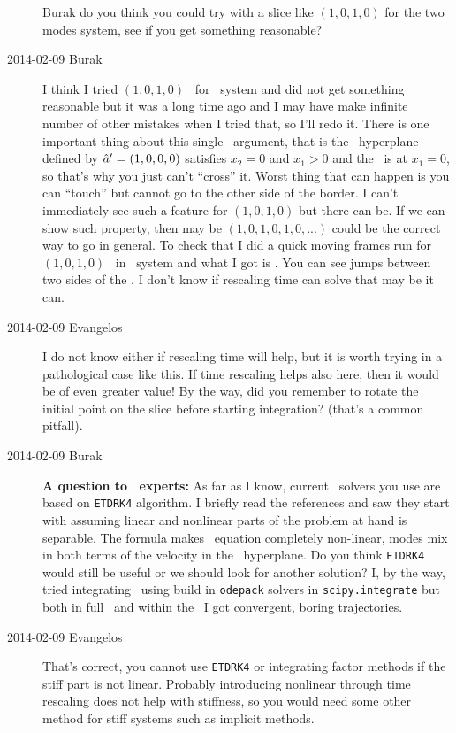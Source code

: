 \begin{description}
Burak do you think you could try  with a slice like
$(1,0,1,0)$ for the two modes system, see if you get something reasonable?

\item[2014-02-09 Burak] I think I tried $(1,0,1,0)$ \slice\ for \twoMode\
system and did not get something reasonable but it was a long time ago and
I may have make infinite number of other mistakes when I tried that, so I'll
redo it. There is one important thing about this single \slice\ argument,
that is the \slice\ hyperplane defined by $\hat{a}' = (1,0,0,0)$ satisfies
$x_2 = 0$ and $x_1 > 0$ and the \chartBord\ is at $x_1 = 0$,
so that's why you just can't ``cross'' it. Worst thing that can happen is
you can ``touch'' but cannot go to the other side of the border. I can't
immediately see such a feature for $(1,0,1,0)$ but there can be. If we can
show such property, then may be $(1,0,1,0,1,0,...)$ could be the correct way
to go in general. To check that I did a quick moving frames run for $(1,0,1,0)$
\slice\ in \twoMode\ system and what I got is \reffig{fig:PKmovingframes1010}.
You can see jumps between two sides of the \chartBord . I don't know if
rescaling time can solve that may be it can.

\item[2014-02-09 Evangelos] I do not know either if rescaling time will help,
but it is worth trying in a pathological case like this. If time rescaling helps
also here, then it would be of even greater value! By the way, did you remember
to rotate the initial point on the slice before starting integration? (that's
a common pitfall).

\item[2014-02-09 Burak] \textbf{A question to \KS\ experts:} As far as
I know, current \KS\ solvers you use are based on \texttt{ETDRK4} algorithm.
I briefly read the references and saw they start with assuming linear and
nonlinear parts of the problem at hand is separable. The formula 
makes \KS\ equation completely non-linear, modes mix in both terms of the
velocity in the \slice\ hyperplane. Do you think \texttt{ETDRK4} would still
be useful or we should look for another solution? I, by the way, tried integrating
\KS\ using build in \texttt{odepack} solvers in \texttt{scipy.integrate}
but both in full \statesp\ and within the \slice\ I got convergent, boring
trajectories.

\item[2014-02-09 Evangelos] That's correct, you cannot use \texttt{ETDRK4}
or integrating factor methods if the stiff part is not linear. Probably introducing
nonlinear through time rescaling does not help with stiffness, so you would need
some other method for stiff systems such as implicit methods.


\end{description}
